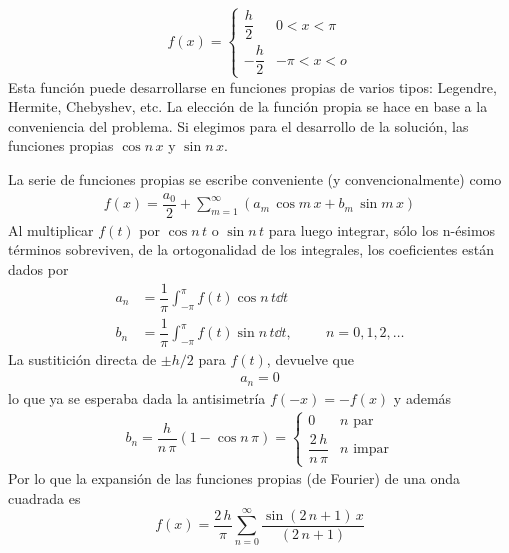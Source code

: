 \begin{equation}
f(x) = \begin{cases}
\dfrac{h}{2} & 0 < x < \pi \\
- \dfrac{h}{2} & -\pi < x < o
\end{cases}
\label{eq_ecuacion_10_37}
\end{equation}
Esta función puede desarrollarse en funciones propias de varios tipos: Legendre, Hermite, Chebyshev, etc. La elección de la función propia se hace en base a la conveniencia del problema. Si elegimos para el desarrollo de la solución, las funciones propias $\cos n \, x$ y $\sin n \, x$.
\par
La serie de funciones propias se escribe conveniente (y convencionalmente) como
\begin{align*}
f(x) = \dfrac{a_{0}}{2} + \sum_{m=1}^{\infty} (a_{m} \, \cos m \, x +  b_{m} \, \sin m \, x)
\end{align*}
Al multiplicar $f(t)$ por $\cos n \, t$ o $\sin n \, t$ para luego integrar, sólo los n-ésimos términos sobreviven, de la ortogonalidad de los integrales, los coeficientes están dados por
\begin{align*}
a_{n} &= \dfrac{1}{\pi} \int_{-\pi}^{\pi} f(t) \cos n \, t \dd{t} \\[1em]
b_{n} &= \dfrac{1}{\pi} \int_{-\pi}^{\pi} f(t) \sin n \, t \dd{t}, \hspace{1cm} n = 0,1,2,\ldots
\end{align*}
La sustitición directa de $\pm h/2$ para $f(t)$, devuelve que
\begin{align*}
 a_{n} = 0
\end{align*}
lo que ya se esperaba dada la antisimetría $f(-x) = - f(x)$ y además
\begin{align*}
b_{n} = \dfrac{h}{n \, \pi} (1 - \cos n \, \pi) = \begin{cases}
0 & n \mbox{ par} \\
\dfrac{2 \, h}{n \, \pi} & n \mbox{ impar} \end{cases}
\end{align*}
Por lo que la expansión de las funciones propias (de Fourier) de una onda cuadrada es
\begin{equation}
f(x) = \dfrac{2 \, h}{\pi} \sum_{n=0}^{\infty} \dfrac{\sin(2 \, n + 1) \, x}{(2 \, n + 1)}
\label{eq:ecuacion_10_38}
\end{equation}
